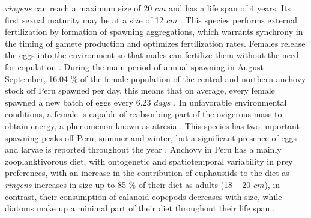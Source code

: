 \textit{\gls{ringens}} can reach a maximum size of 20 $cm$ and has a life span of 4 years. Its first sexual maturity may be at a size of 12 $cm$ \citep{GutiSwar2007,MarzShin2009}. This species performs external fertilization by formation of spawning aggregations, which warrants synchrony in the timing of gamete production and optimizes fertilization rates. Females release the eggs into the environment so that males can fertilize them without the need for copulation \citep{Gani2014}. During the main period of annual spawning in August-September, 16.04 \% of the female population of the central and northern anchovy stock off Peru spawned per day, this means that on average, every female spawned a new batch of eggs every 6.23 $days$ \citep{AlheAlar1984,AlheAleg1983}. In unfavorable environmental conditions, a female is capable of reabsorbing part of the ovigerous mass to obtain energy, a phenomenon known as atresia \citep{PereRoqu2008,EspiVera2009,ClarCast2012,BuitPere2018}. This species has two important spawning peaks off Peru, summer and winter, but a significant presence of eggs and larvae is reported throughout the year \citep{MarzShin2009}. Anchovy in Peru has a mainly zooplanktivorous diet, with ontogenetic and spatiotemporal variability in prey preferences, with an increase in the contribution of euphausiids to the diet as \textit{\gls{ringens}} increases in size up to 85 \% of their diet as adults (18 – 20 $cm$), in contrast, their consumption of calanoid copepods decreases with size, while diatoms make up a minimal part of their diet throughout their life span \citep{EspiBert2008,EspiBert2014}.\\

